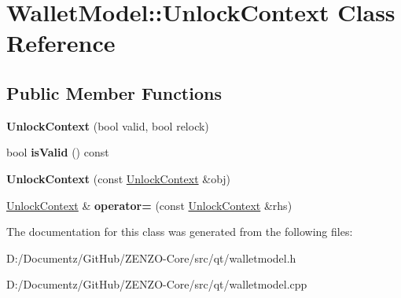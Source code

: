 \hypertarget{class_wallet_model_1_1_unlock_context}{}\section{Wallet\+Model\+::Unlock\+Context Class Reference}
\label{class_wallet_model_1_1_unlock_context}
\subsection*{Public Member Functions}
\begin{DoxyCompactItemize}
\item 
\mbox{\label{class_wallet_model_1_1_unlock_context_aad26e29e6036b7101554361e0a38942d}} 
{\bfseries Unlock\+Context} (bool valid, bool relock)
\item 
\mbox{\label{class_wallet_model_1_1_unlock_context_af78f7b7743056a19a461db84c6de2901}} 
bool {\bfseries is\+Valid} () const
\item 
\mbox{\label{class_wallet_model_1_1_unlock_context_afad6dc72ce1f4af4989efd2aed155759}} 
{\bfseries Unlock\+Context} (const \mbox{\hyperlink{class_wallet_model_1_1_unlock_context}{Unlock\+Context}} \&obj)
\item 
\mbox{\label{class_wallet_model_1_1_unlock_context_a8cdc737caa53323e9bff4e22ea20f440}} 
\mbox{\hyperlink{class_wallet_model_1_1_unlock_context}{Unlock\+Context}} \& {\bfseries operator=} (const \mbox{\hyperlink{class_wallet_model_1_1_unlock_context}{Unlock\+Context}} \&rhs)
\end{DoxyCompactItemize}


The documentation for this class was generated from the following files\+:\begin{DoxyCompactItemize}
\item 
D\+:/\+Documentz/\+Git\+Hub/\+Z\+E\+N\+Z\+O-\/\+Core/src/qt/walletmodel.\+h\item 
D\+:/\+Documentz/\+Git\+Hub/\+Z\+E\+N\+Z\+O-\/\+Core/src/qt/walletmodel.\+cpp\end{DoxyCompactItemize}
